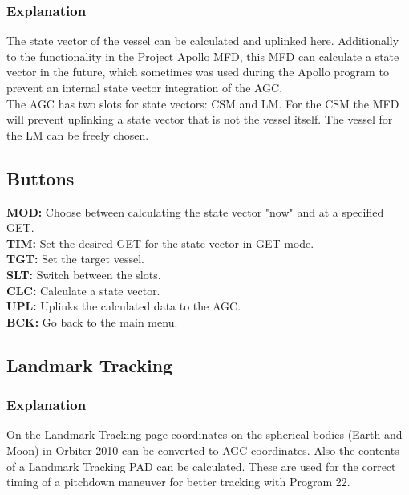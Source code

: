 \documentclass[11pt]{article} %
\begin{document}
\subsubsection{Explanation}

The state vector of the vessel can be calculated and uplinked here. Additionally to the functionality in the Project Apollo MFD, this MFD can calculate a state vector in the future, which sometimes was used during the Apollo program to prevent an internal state vector integration of the AGC.\\
The AGC has two slots for state vectors: CSM and LM. For the CSM the MFD will prevent uplinking a state vector that is not the vessel itself. The vessel for the LM can be freely chosen.\\

\subsection{Buttons}

\textbf{MOD:} Choose  between calculating the state vector "now" and at a specified GET.\\
\textbf{TIM:} Set the desired GET for the state vector in GET mode.\\
\textbf{TGT:} Set the target vessel.\\
\textbf{SLT:} Switch between the slots.\\
\textbf{CLC:} Calculate a state vector.\\
\textbf{UPL:} Uplinks the calculated data to the AGC.\\
\textbf{BCK:} Go back to the main menu.\\

\subsection{Landmark Tracking}

\subsubsection{Explanation}

On the Landmark Tracking page coordinates on the spherical bodies (Earth and Moon) in Orbiter 2010 can be converted to AGC coordinates. Also the contents of a Landmark Tracking PAD can be calculated. These are used for the correct timing of a pitchdown maneuver for better tracking with Program 22.
\end{document}
